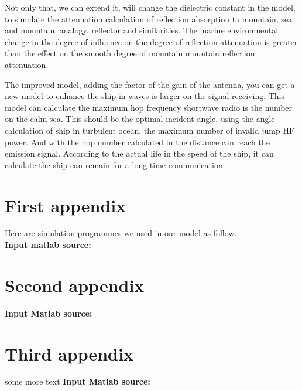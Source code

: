 \documentclass{mcmthesis}
\begin{document}
Not only that, we can extend it, will change the dielectric constant in the model, to simulate the attenuation calculation of reflection absorption to mountain, sea and mountain, analogy, reflector and similarities. The marine environmental change in the degree of influence on the degree of reflection attenuation is greater than the effect on the smooth degree of mountain mountain reflection attenuation.

The improved model, adding the factor of the gain of the antenna, you can get a new model to enhance the ship in waves is larger on the signal receiving.
This model can calculate the maximum hop frequency shortwave radio is the number on the calm sea. This should be the optimal incident angle, using the angle calculation of ship in turbulent ocean, the maximum number of invalid jump HF power. And with the hop number calculated in the distance can reach the emission signal. According to the actual life in the speed of the ship, it can calculate the ship can remain for a long time communication.



\clearpage





\begin{appendices}

\section{First appendix}

Here are simulation programmes we used in our model as follow.\\

\textbf{\textcolor[rgb]{0.98,0.00,0.00}{Input matlab source:}}


\section{Second appendix}

\textbf{\textcolor[rgb]{0.98,0.00,0.00}{Input Matlab source:}}


\section{Third appendix}

some more text \textcolor[rgb]{0.98,0.00,0.00}{\textbf{Input Matlab source:}}


\end{appendices}
\end{document}

